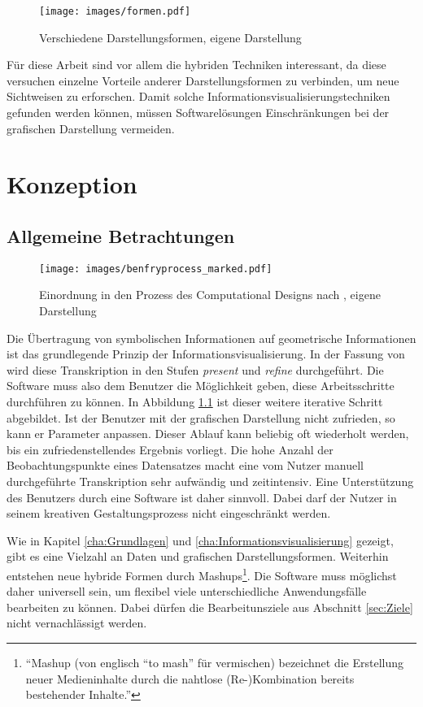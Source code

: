 \documentclass[a4paper, 
               12pt,
               DIV=calc,
               version=first,
               pdftex,
               headsepline,
               footsepline,
               bibtotocnumbered,
               liststotocnumbered]{scrreprt}
\begin{document}
\begin{figure}
\centering
\texttt{[image: images/formen.pdf]}
\caption{Verschiedene Darstellungsformen, eigene Darstellung}
\label{fig:formen}
\end{figure}

Für diese Arbeit sind vor allem die hybriden Techniken interessant, da diese versuchen
einzelne Vorteile anderer Darstellungsformen zu verbinden, um neue Sichtweisen zu erforschen.
Damit solche Informationsvisualisierungstechniken gefunden werden können, müssen
Softwarelösungen Einschränkungen bei der grafischen Darstellung vermeiden.

\chapter{Konzeption}
\label{cha:Software}
\section{Allgemeine Betrachtungen}
\label{sec:AllgemeineBetrachtungen}
\begin{figure}
\centering
\texttt{[image: images/benfryprocess\_marked.pdf]}
\caption{Einordnung in den Prozess des Computational Designs nach \citep{BenFry}, eigene Darstellung}
\label{fig:benfryprocess_marked}
\end{figure}
Die Übertragung von symbolischen Informationen auf geometrische Informationen ist das grundlegende Prinzip der
Informationsvisualisierung. In der Fassung von \citep{BenFry} wird diese Transkription in den
Stufen \textit{present} und \textit{refine} durchgeführt. Die Software muss also dem Benutzer die Möglichkeit geben,
diese Arbeitsschritte durchführen zu können. In Abbildung \ref{fig:benfryprocess_marked} ist dieser weitere iterative Schritt
abgebildet. Ist der Benutzer mit der grafischen Darstellung nicht zufrieden, so kann er Parameter anpassen. Dieser Ablauf
kann beliebig oft wiederholt werden, bis ein zufriedenstellendes Ergebnis vorliegt.
Die hohe Anzahl der Beobachtungspunkte eines Datensatzes macht eine vom Nutzer manuell durchgeführte Transkription
sehr aufwändig und zeitintensiv. Eine Unterstützung des Benutzers durch eine Software ist daher sinnvoll.
Dabei darf der Nutzer in seinem kreativen Gestaltungsprozess nicht eingeschränkt werden.

Wie in Kapitel \ref{cha:Grundlagen} und \ref{cha:Informationsvisualisierung} gezeigt, gibt es eine Vielzahl an
Daten und grafischen Darstellungsformen. Weiterhin entstehen neue hybride Formen durch Mashups\footnote{"`Mashup (von
englisch "`to mash"' für vermischen) bezeichnet die Erstellung neuer Medieninhalte durch die nahtlose
(Re-)Kombination bereits bestehender Inhalte."'\citep{wiki_mashup}}.
Die Software muss möglichst daher universell sein, um flexibel viele unterschiedliche Anwendungsfälle
bearbeiten zu können. Dabei dürfen die Bearbeitunsziele aus Abschnitt \ref{sec:Ziele} nicht
vernachlässigt werden.
\end{document}
